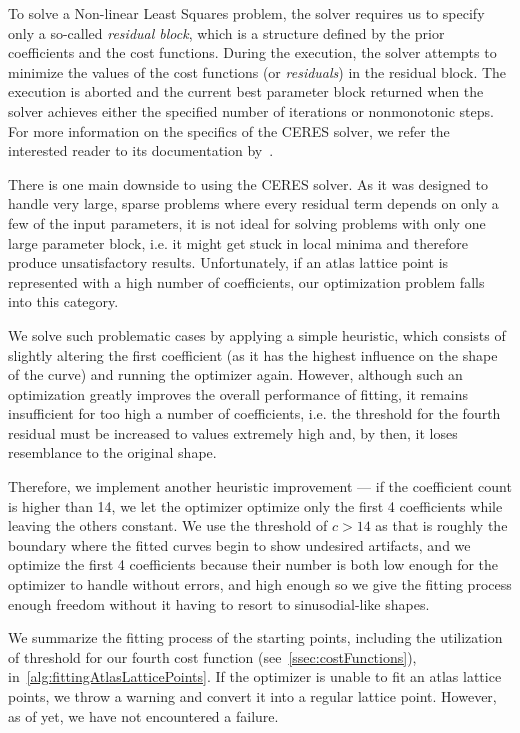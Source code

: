 To solve a Non-linear Least Squares problem, the solver requires us to specify only a so-called \emph{residual block}, which is a structure defined by the prior coefficients and the cost functions. During the execution, the solver attempts to minimize the values of the cost functions (or \emph{residuals}) in the residual block. The execution is aborted and the current best parameter block returned when the solver achieves either the specified number of iterations or nonmonotonic steps. For more information on the specifics of the CERES solver, we refer the interested reader to its documentation by~\citet{ceresNonLinearLeastSquares}.

There is one main downside to using the CERES solver. As it was designed to handle very large, sparse problems where every residual term depends on only a few of the input parameters, it is not ideal for solving problems with only one large parameter block, i.e. it might get stuck in local minima and therefore produce unsatisfactory results. Unfortunately, if an atlas lattice point is represented with a high number of coefficients, our optimization problem falls into this category.

We solve such problematic cases by applying a simple heuristic, which consists of slightly altering the first coefficient (as it has the highest influence on the shape of the curve) and running the optimizer again. However, although such an optimization greatly improves the overall performance of fitting, it remains insufficient for too high a number of coefficients, i.e. the threshold for the fourth residual must be increased to values extremely high and, by then, it loses resemblance to the original shape.

Therefore, we implement another heuristic improvement --- if the coefficient count is higher than 14, we let the optimizer optimize only the first 4 coefficients while leaving the others constant. We use the threshold of $c > 14$ as that is roughly the boundary where the fitted curves begin to show undesired artifacts, and we optimize the first 4 coefficients because their number is both low enough for the optimizer to handle without errors, and high enough so we give the fitting process enough freedom without it having to resort to sinusodial-like shapes.

We summarize the fitting process of the starting points, including the utilization of threshold for our fourth cost function (see~\cref{ssec:costFunctions}), in~\cref{alg:fittingAtlasLatticePoints}. If the optimizer is unable to fit an atlas lattice points, we throw a warning and convert it into a regular lattice point. However, as of yet, we have not encountered a failure.


